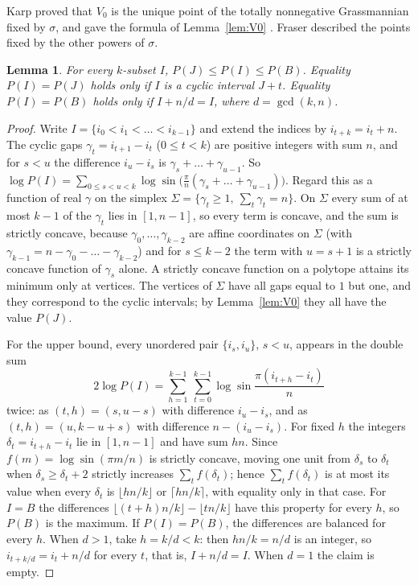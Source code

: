 \documentclass[11pt]{article}
\newtheorem{lemma}[theorem]{Lemma}
\theoremstyle{remark}
\begin{document}
Karp \cite[Theorem~1.1]{K} proved that $V_0$ is the unique point of the totally nonnegative Grassmannian fixed by $\sigma$, and gave the formula of Lemma~\ref{lem:V0} \cite[(1.4)]{K}. Fraser \cite{Fr} described the points fixed by the other powers of $\sigma$.

\begin{lemma}\label{lem:extremes}
For every $k$-subset $I$, $P(J)\le P(I)\le P(B)$. Equality $P(I)=P(J)$ holds only if $I$ is a cyclic interval $J+t$. Equality $P(I)=P(B)$ holds only if $I+n/d=I$, where $d=\gcd(k,n)$.
\end{lemma}

\begin{proof}
Write $I=\{i_0<i_1<\dots<i_{k-1}\}$ and extend the indices by $i_{t+k}=i_t+n$. The cyclic gaps $\gamma_t=i_{t+1}-i_t$ ($0\le t<k$) are positive integers with sum $n$, and for $s<u$ the difference $i_u-i_s$ is $\gamma_s+\dots+\gamma_{u-1}$. So $\log P(I)=\sum_{0\le s<u<k}\log\sin\big(\tfrac{\pi}{n}(\gamma_s+\dots+\gamma_{u-1})\big)$. Regard this as a function of real $\gamma$ on the simplex $\Sigma=\{\gamma_t\ge1,\ \sum_t\gamma_t=n\}$. On $\Sigma$ every sum of at most $k-1$ of the $\gamma_t$ lies in $[1,n-1]$, so every term is concave, and the sum is strictly concave, because $\gamma_0,\dots,\gamma_{k-2}$ are affine coordinates on $\Sigma$ (with $\gamma_{k-1}=n-\gamma_0-\dots-\gamma_{k-2}$) and for $s\le k-2$ the term with $u=s+1$ is a strictly concave function of $\gamma_s$ alone. A strictly concave function on a polytope attains its minimum only at vertices. The vertices of $\Sigma$ have all gaps equal to $1$ but one, and they correspond to the cyclic intervals; by Lemma~\ref{lem:V0} they all have the value $P(J)$.

For the upper bound, every unordered pair $\{i_s,i_u\}$, $s<u$, appears in the double sum
\[
2\log P(I)=\sum_{h=1}^{k-1}\ \sum_{t=0}^{k-1}\log\sin\frac{\pi(i_{t+h}-i_t)}{n}
\]
twice: as $(t,h)=(s,u-s)$ with difference $i_u-i_s$, and as $(t,h)=(u,k-u+s)$ with difference $n-(i_u-i_s)$. For fixed $h$ the integers $\delta_t=i_{t+h}-i_t$ lie in $[1,n-1]$ and have sum $hn$. Since $f(m)=\log\sin(\pi m/n)$ is strictly concave, moving one unit from $\delta_s$ to $\delta_t$ when $\delta_s\ge\delta_t+2$ strictly increases $\sum_tf(\delta_t)$; hence $\sum_tf(\delta_t)$ is at most its value when every $\delta_t$ is $\lfloor hn/k\rfloor$ or $\lceil hn/k\rceil$, with equality only in that case. For $I=B$ the differences $\lfloor (t+h)n/k\rfloor-\lfloor tn/k\rfloor$ have this property for every $h$, so $P(B)$ is the maximum. If $P(I)=P(B)$, the differences are balanced for every $h$. When $d>1$, take $h=k/d<k$: then $hn/k=n/d$ is an integer, so $i_{t+k/d}=i_t+n/d$ for every $t$, that is, $I+n/d=I$. When $d=1$ the claim is empty.
\end{proof}
\end{document}

